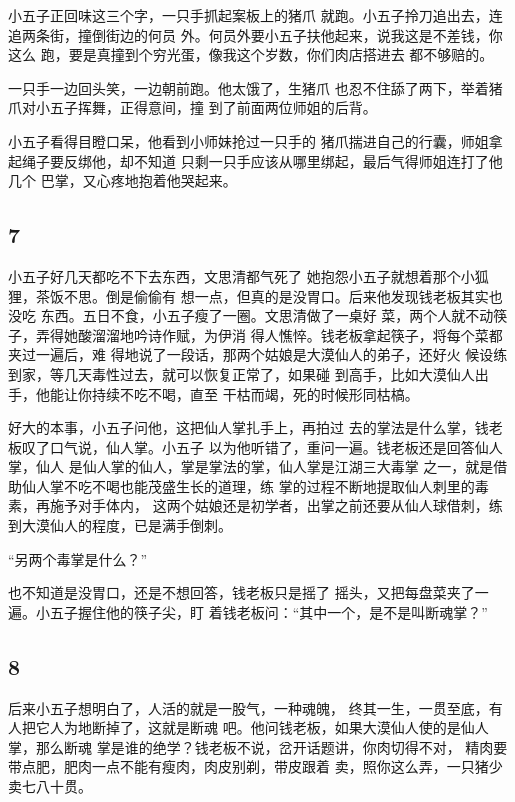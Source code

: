 小五子正回味这三个字，一只手抓起案板上的猪爪
就跑。小五子拎刀追出去，连追两条街，撞倒街边的何员
外。何员外要小五子扶他起来，说我这是不差钱，你这么
跑，要是真撞到个穷光蛋，像我这个岁数，你们肉店搭进去
都不够赔的。

一只手一边回头笑，一边朝前跑。他太饿了，生猪爪
也忍不住舔了两下，举着猪爪对小五子挥舞，正得意间，撞
到了前面两位师姐的后背。

小五子看得目瞪口呆，他看到小师妹抢过一只手的
猪爪揣进自己的行囊，师姐拿起绳子要反绑他，却不知道
只剩一只手应该从哪里绑起，最后气得师姐连打了他几个
巴掌，又心疼地抱着他哭起来。
\newline

{\centering\subsection{7}}

小五子好几天都吃不下去东西，文思清都气死了
她抱怨小五子就想着那个小狐狸，茶饭不思。倒是偷偷有
想一点，但真的是没胃口。后来他发现钱老板其实也没吃
东西。五日不食，小五子瘦了一圈。文思清做了一桌好
菜，两个人就不动筷子，弄得她酸溜溜地吟诗作赋，为伊消
得人憔悴。钱老板拿起筷子，将每个菜都夹过一遍后，难
得地说了一段话，那两个姑娘是大漠仙人的弟子，还好火
候设练到家，等几天毒性过去，就可以恢复正常了，如果碰
到高手，比如大漠仙人出手，他能让你持续不吃不喝，直至
干枯而竭，死的时候形同枯槁。

好大的本事，小五子问他，这把仙人掌扎手上，再拍过
去的掌法是什么掌，钱老板叹了口气说，仙人掌。小五子
以为他听错了，重问一遍。钱老板还是回答仙人掌，仙人
是仙人掌的仙人，掌是掌法的掌，仙人掌是江湖三大毒掌
之一，就是借助仙人掌不吃不喝也能茂盛生长的道理，练
掌的过程不断地提取仙人刺里的毒素，再施予对手体内，
这两个姑娘还是初学者，出掌之前还要从仙人球借刺，练
到大漠仙人的程度，已是满手倒刺。

“另两个毒掌是什么？”

也不知道是没胃口，还是不想回答，钱老板只是摇了
摇头，又把每盘菜夹了一遍。小五子握住他的筷子尖，盯
着钱老板问：“其中一个，是不是叫断魂掌？”
\newline

{\centering\subsection{8}}

后来小五子想明白了，人活的就是一股气，一种魂魄，
终其一生，一贯至底，有人把它人为地断掉了，这就是断魂
吧。他问钱老板，如果大漠仙人使的是仙人掌，那么断魂
掌是谁的绝学？钱老板不说，岔开话题讲，你肉切得不对，
精肉要带点肥，肥肉一点不能有瘦肉，肉皮别剃，带皮跟着
卖，照你这么弄，一只猪少卖七八十贯。

